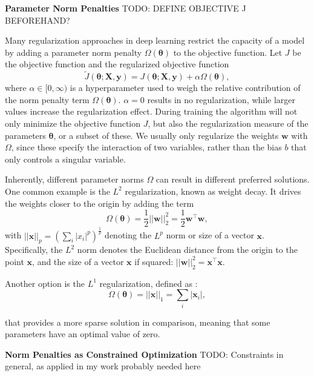 \textbf{Parameter Norm Penalties}
TODO: DEFINE OBJECTIVE J BEFOREHAND?

Many regularization approaches in deep learning restrict the capacity of a model by adding a parameter norm penalty $\Omega(\boldsymbol{\theta})$ to the objective function. Let $J$ be the objective function and the regularized objective function
\begin{equation}
    \tilde{J}(\boldsymbol{\theta}; \mathbf{X}, \mathbf{y}) = J(\boldsymbol{\theta}; \mathbf{X}, \mathbf{y}) + \alpha\Omega(\boldsymbol{\theta}),
\end{equation}
where $\alpha \in [0,\infty)$ is a hyperparameter used to weigh the relative contribution of the norm penalty term $\Omega(\boldsymbol{\theta})$. $\alpha=0$ results in no regularization, while larger values increase the regularization effect. During training the algorithm will not only minimize the objective function $J$, but also the regularization measure of the parameters $\boldsymbol{\theta}$, or a subset of these. We usually only regularize the weights $\mathbf{w}$ with $\Omega$, since these specify the interaction of two variables, rather than the bias $b$ that only controls a singular variable.

Inherently, different parameter norms $\Omega$ can result in different preferred solutions. One common example is the $L^2$ regularization, known as weight decay. It drives the weights closer to the origin by adding the term
\begin{equation}
    \Omega(\boldsymbol{\theta}) = \frac{1}{2}||\mathbf{w}||_2^2 = \frac{1}{2}\mathbf{w}^\top \mathbf{w},
\end{equation}
with $||\mathbf{x}||_p = (\sum_i |x_i|^p)^\frac{1}{p}$ denoting the $L^p$ norm or size of a vector $\mathbf{x}$. Specifically, the $L^2$ norm denotes the Euclidean distance from the origin to the point $\mathbf{x}$, and the size of a vector $\mathbf{x}$ if squared: $||\mathbf{w}||_2^2 = \mathbf{x}^\top \mathbf{x}$.

Another option is the $L^1$ regularization, defined as :
\begin{equation}
    \Omega(\boldsymbol{\theta}) = ||\mathbf{x}||_1 = \sum_i |\mathbf{x}_i|,
\end{equation}

that provides a more sparse solution in comparison, meaning that some parameters have an optimal value of zero.


\textbf{Norm Penalties as Constrained Optimization}
TODO: Constraints in general, as applied in my work probably needed here

